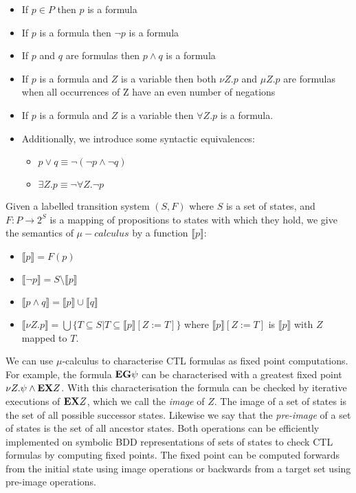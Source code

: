 \begin{itemize}
    \item If $p \in P$ then $p$ is a formula
    \item If $p$ is a formula then $\lnot p$ is a formula
    \item If $p$ and $q$ are formulas then $p \land q$ is a formula
    \item If $p$ is a formula and $Z$ is a variable then both $\nu Z . p$ and $\mu Z . p$ are formulas when all occurrences of Z have an even number of negations
    \item If $p$ is a formula and $Z$ is a variable then $\forall Z . p$ is a formula.
    \item Additionally, we introduce some syntactic equivalences:
        \begin{itemize}
            \item $p \lor q \equiv \lnot ( \lnot p \land \lnot q )$
            \item $\exists Z . p \equiv \lnot \forall Z . \lnot p$
        \end{itemize}
\end{itemize}

Given a labelled transition system $(S, F)$ where $S$ is a set of states, and $F : P \to 2^S$ is a mapping of propositions to states with which they hold, we give the semantics of $\mu-calculus$ by a function $\llbracket p \rrbracket$:

\begin{itemize}
    \item $\llbracket p \rrbracket = F(p)$
    \item $\llbracket \lnot p \rrbracket = S \setminus \llbracket p \rrbracket$
    \item $\llbracket p \land q \rrbracket = \llbracket p \rrbracket \cup \llbracket q \rrbracket$
    \item $\llbracket \nu Z . p \rrbracket = \bigcup \{ T \subseteq S | T \subseteq \llbracket p \rrbracket [ Z := T ] \}$ where $\llbracket p \rrbracket [ Z := T ]$ is $\llbracket p \rrbracket$ with $Z$ mapped to $T$.
\end{itemize}

We can use $\mu$-calculus to characterise CTL formulas as fixed point computations. For example, the formula $\textbf{E} \textbf{G} \psi$ can be characterised with a greatest fixed point $\nu Z . \psi \land \textbf{E} \textbf{X} Z$. With this characterisation the formula can be checked by iterative executions of $\textbf{E} \textbf{X} Z$, which we call the \emph{image} of $Z$. The image of a set of states is the set of all possible successor states. Likewise we say that the \emph{pre-image} of a set of states is the set of all ancestor states. Both operations can be efficiently implemented on symbolic BDD representations of sets of states to check CTL formulas by computing fixed points. The fixed point can be computed forwards from the initial state using image operations or backwards from a target set using pre-image operations.

